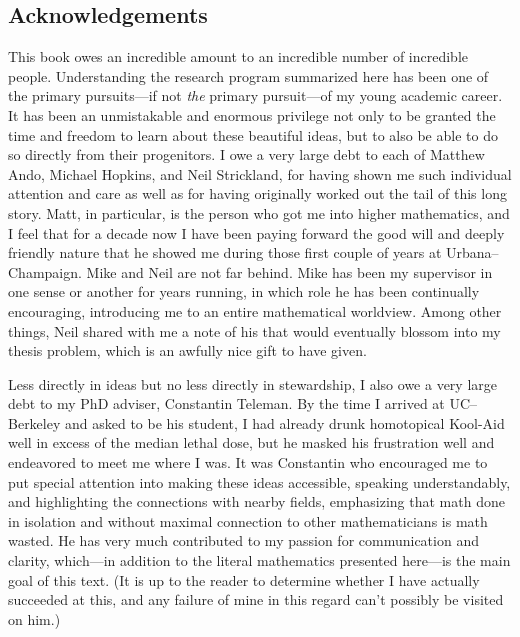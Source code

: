 
% 

\newpage

\subsection*{Acknowledgements}


This book owes an incredible amount to an incredible number of incredible people.  Understanding the research program summarized here has been one of the primary pursuits---if not \emph{the} primary pursuit---of my young academic career.  It has been an unmistakable and enormous privilege not only to be granted the time and freedom to learn about these beautiful ideas, but to also be able to do so directly from their progenitors.  I owe a very large debt to each of Matthew Ando, Michael Hopkins, and Neil Strickland, for having shown me such individual attention and care as well as for having originally worked out the tail of this long story.  Matt, in particular, is the person who got me into higher mathematics, and I feel that for a decade now I have been paying forward the good will and deeply friendly nature that he showed me during those first couple of years at Urbana--Champaign.  Mike and Neil are not far behind.  Mike has been my supervisor in one sense or another for years running, in which role he has been continually encouraging, introducing me to an entire mathematical worldview.  Among other things, Neil shared with me a note of his that would eventually blossom into my thesis problem, which is an awfully nice gift to have given.

Less directly in ideas but no less directly in stewardship, I also owe a very large debt to my PhD adviser, Constantin Teleman.  By the time I arrived at UC--Berkeley and asked to be his student, I had already drunk homotopical Kool-Aid well in excess of the median lethal dose, but he masked his frustration well and endeavored to meet me where I was.  It was Constantin who encouraged me to put special attention into making these ideas accessible, speaking understandably, and highlighting the connections with nearby fields, emphasizing that math done in isolation and without maximal connection to other mathematicians is math wasted.  He has very much contributed to my passion for communication and clarity, which---in addition to the literal mathematics presented here---is the main goal of this text.  (It is up to the reader to determine whether I have actually succeeded at this, and any failure of mine in this regard can't possibly be visited on him.)

